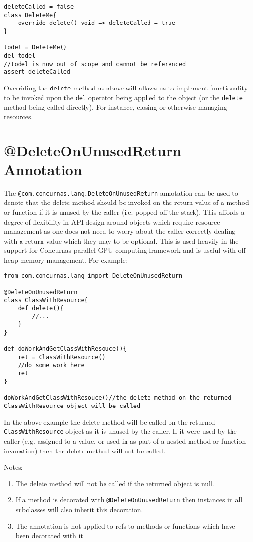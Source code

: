 \documentclass[conc-doc]{subfiles}
\begin{document}
\begin{lstlisting}
deleteCalled = false
class DeleteMe{
	override delete() void => deleteCalled = true
}

todel = DeleteMe()
del todel
//todel is now out of scope and cannot be referenced
assert deleteCalled
\end{lstlisting}

Overriding the \lstinline{delete} method as above will allows us to implement functionality to be invoked upon the \lstinline{del} operator being applied to the object (or the \lstinline{delete} method being called directly). For instance, closing or otherwise managing resources.

\section{@DeleteOnUnusedReturn Annotation}
The \lstinline{@com.concurnas.lang.DeleteOnUnusedReturn} annotation can be used to denote that the delete method should be invoked on the return value of a method or function if it is unused by the caller (i.e. popped off the stack). This affords a degree of flexibility in API design around objects which require resource management as one does not need to worry about the caller correctly dealing with a return value which they may to be optional. This is used heavily in the support for Concurnas parallel GPU computing framework and is useful with off heap memory management. For example:

\begin{lstlisting}
from com.concurnas.lang import DeleteOnUnusedReturn

@DeleteOnUnusedReturn
class ClassWithResource{
	def delete(){
		//...
	}
}

def doWorkAndGetClassWithResouce(){
	ret = ClassWithResource()
	//do some work here
	ret
}

doWorkAndGetClassWithResouce()//the delete method on the returned ClassWithResource object will be called
\end{lstlisting}
\begin{sloppypar}
In the above example the delete method will be called on the returned \lstinline{ClassWithResource} object as it is unused by the caller. If it were used by the caller (e.g. assigned to a value, or used in as part of a nested method or function invocation) then the delete method will not be called.
\end{sloppypar}

Notes:
\begin{enumerate}
	\item The delete method will not be called if the returned object is null.
	\item If a method is decorated with \lstinline{@DeleteOnUnusedReturn} then instances in all subclasses will also inherit this decoration.
	\item The annotation is not applied to refs to methods or functions which have been decorated with it.
\end{enumerate}
\end{document}
